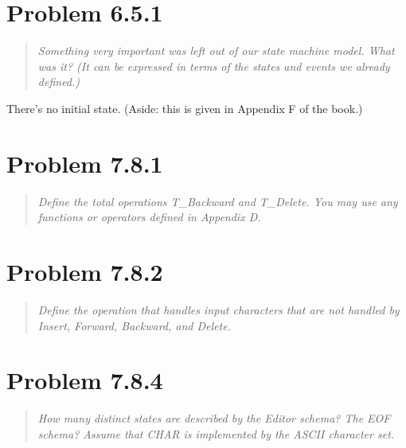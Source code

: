 \documentclass[11pt]{article}
\begin{document}
\section{Problem 6.5.1}
\begin{quote} \textit{
    Something very important was left out of our state machine model. What was it? (It can be
    expressed in terms of the states and events we already defined.)
  } \end{quote}

There's no initial state. (Aside: this is given in Appendix F of the book.)

\section{Problem 7.8.1}

\begin{quote}
  \textit{Define the total operations T\_Backward and T\_Delete.  You may use any functions or
    operators defined in Appendix D. }
\end{quote}

\section{Problem 7.8.2}

\begin{quote}
  \textit{Define the operation that handles input characters that are not handled by Insert,
    Forward, Backward, and Delete.}
\end{quote}


\section{Problem 7.8.4}

\begin{quote}
  \textit{How many distinct states are described by the Editor schema? The EOF schema? Assume that
    CHAR is implemented by the ASCII character set.}
\end{quote}
\end{document}
